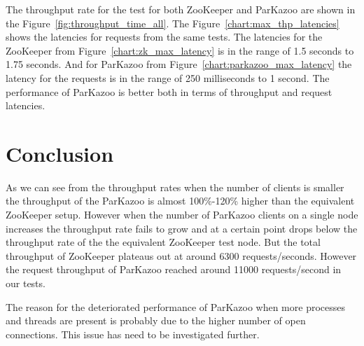 

The throughput rate for the test for both ZooKeeper and ParKazoo are shown in the Figure~\ref{fig:throughput_time_all}. The Figure~\ref{chart:max_thp_latencies} shows the latencies for requests from the same tests. The latencies for the ZooKeeper from Figure~\ref{chart:zk_max_latency} is in the range of 1.5 seconds to 1.75 seconds. And for ParKazoo from Figure~\ref{chart:parkazoo_max_latency} the latency for the requests is in the range of 250 milliseconds to 1 second. The performance of ParKazoo is better both in terms of throughput and request latencies.




\section{Conclusion}
As we can see from the throughput rates when the number of clients is smaller the throughput of the ParKazoo is almost 100\%-120\% higher than the equivalent ZooKeeper setup. However when the number of ParKazoo clients on a single node increases the throughput rate fails to grow and at a certain point drops below the throughput rate of the the equivalent ZooKeeper test node. But the total throughput of ZooKeeper plateaus out at around 6300 requests/seconds. However the request throughput of ParKazoo reached around 11000 requests/second in our tests.

The reason for the deteriorated performance of ParKazoo when more processes and threads are present is probably due to the higher number of open connections. This issue has need to be investigated further. 
